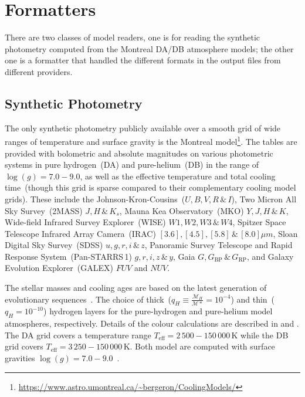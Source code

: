 \documentclass[fleqn,usenatbib]{rasti}
\begin{document}
\section{Formatters}
There are two classes of model readers, one is for reading the synthetic
photometry computed from the Montreal DA/DB atmosphere models; the other one is
a formatter that handled the different formats in the output files from
different providers.

\subsection*{Synthetic Photometry}
The only synthetic photometry publicly available over a smooth grid of wide
ranges of temperature and surface gravity is the Montreal
model\footnote{\url{https://www.astro.umontreal.ca/~bergeron/CoolingModels/}}.
The tables are provided with bolometric and absolute magnitudes on various
photometric systems in pure hydrogen~(DA) and pure-helium~(DB) in the range of
$\log(g)=7.0 - 9.0$, as well as the effective temperature and total cooling
time~(though this grid is sparse compared to their complementary cooling model
grids). These include the Johnson-Kron-Cousins~($U, B, V, R\,\&\,I$),
Two Micron All Sky Survey~(2MASS) $J, H\,\&\,K_{s}$, Mauna Kea Observatory~(MKO)
$Y, J, H\,\&\,K$, Wide-field Infrared Survey Explorer~(WISE) $W1, W2, W3\,\&\,W4$,
Spitzer Space Telescope Infrared Array Camera~(IRAC)
$[3.6], [4.5], [5.8]\,\&\,[8.0] \mu m$, Sloan Digital Sky Survey~(SDSS)
$u, g, r, i\,\&\,z$, Panoramic Survey Telescope and Rapid Response
System~(Pan-STARRS\,1) $g, r, i, z\,\&\,y$,
Gaia $G, G_{\mathrm{BP}}\,\&\,G_{\mathrm{RP}}$, and Galaxy Evolution
Explorer~(GALEX) $FUV$ and $NUV$.

The stellar masses and cooling ages are based on the latest generation of
evolutionary sequences~\citep{2020ApJ...901...93B}. The choice of
thick~($q_H \equiv \frac{\mathcal{M}_H}{\mathcal{M}*} = 10^{-4}$) and thin~($q_H = 10^{-10}$)
hydrogen layers for the pure-hydrogen and pure-helium model atmospheres,
respectively. Details of the colour calculations are described in
\citet{1995PASP..107.1047B} and \citet{2006AJ....132.1221H}. The DA grid covers
a temperature range $T_{\mathrm{eff}} = 2\,500 - 150\,000$\,K while the DB grid
covers $T_{\mathrm{eff}} = 3\,250 - 150\,000$\,K. Both model are computed with
surface gravities $\log(g) = 7.0 - 9.0$~\citep{2018ApJ...863..184B,
2020ApJ...901...93B, 2011ApJ...730..128T, 2011ApJ...737...28B,
2006ApJ...651L.137K}.
\end{document}
